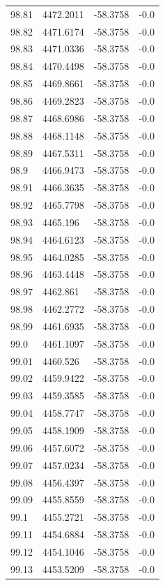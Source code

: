\begin{table}[H]
\begin{tabular}{llll}
98.81 & 4472.2011 & -58.3758 & -0.0 \\
98.82 & 4471.6174 & -58.3758 & -0.0 \\
98.83 & 4471.0336 & -58.3758 & -0.0 \\
98.84 & 4470.4498 & -58.3758 & -0.0 \\
98.85 & 4469.8661 & -58.3758 & -0.0 \\
98.86 & 4469.2823 & -58.3758 & -0.0 \\
98.87 & 4468.6986 & -58.3758 & -0.0 \\
98.88 & 4468.1148 & -58.3758 & -0.0 \\
98.89 & 4467.5311 & -58.3758 & -0.0 \\
98.9 & 4466.9473 & -58.3758 & -0.0 \\
98.91 & 4466.3635 & -58.3758 & -0.0 \\
98.92 & 4465.7798 & -58.3758 & -0.0 \\
98.93 & 4465.196 & -58.3758 & -0.0 \\
98.94 & 4464.6123 & -58.3758 & -0.0 \\
98.95 & 4464.0285 & -58.3758 & -0.0 \\
98.96 & 4463.4448 & -58.3758 & -0.0 \\
98.97 & 4462.861 & -58.3758 & -0.0 \\
98.98 & 4462.2772 & -58.3758 & -0.0 \\
98.99 & 4461.6935 & -58.3758 & -0.0 \\
99.0 & 4461.1097 & -58.3758 & -0.0 \\
99.01 & 4460.526 & -58.3758 & -0.0 \\
99.02 & 4459.9422 & -58.3758 & -0.0 \\
99.03 & 4459.3585 & -58.3758 & -0.0 \\
99.04 & 4458.7747 & -58.3758 & -0.0 \\
99.05 & 4458.1909 & -58.3758 & -0.0 \\
99.06 & 4457.6072 & -58.3758 & -0.0 \\
99.07 & 4457.0234 & -58.3758 & -0.0 \\
99.08 & 4456.4397 & -58.3758 & -0.0 \\
99.09 & 4455.8559 & -58.3758 & -0.0 \\
99.1 & 4455.2721 & -58.3758 & -0.0 \\
99.11 & 4454.6884 & -58.3758 & -0.0 \\
99.12 & 4454.1046 & -58.3758 & -0.0 \\
99.13 & 4453.5209 & -58.3758 & -0.0 \\

\end{tabular}
\end{table}
